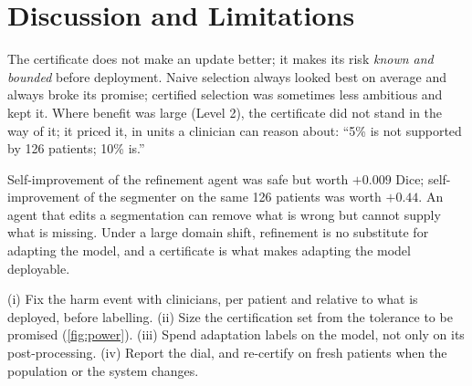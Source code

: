 \section{Discussion and Limitations}
\label{sec:discussion}

The certificate does not make an update better; it makes its risk \emph{known and bounded} before deployment.
Naive selection always looked best on average and always broke its promise; certified selection was sometimes less ambitious and kept it.
Where benefit was large (Level 2), the certificate did not stand in the way of it; it priced it, in units a clinician can reason about: ``5\% is not supported by 126 patients; 10\% is.''

Self-improvement of the refinement agent was safe but worth $+0.009$ Dice; self-improvement of the segmenter on the same 126 patients was worth $+0.44$.
An agent that edits a segmentation can remove what is wrong but cannot supply what is missing.
Under a large domain shift, refinement is no substitute for adapting the model, and a certificate is what makes adapting the model deployable.

(i) Fix the harm event with clinicians, per patient and relative to what is deployed, before labelling.
(ii) Size the certification set from the tolerance to be promised (\cref{fig:power}).
(iii) Spend adaptation labels on the model, not only on its post-processing.
(iv) Report the dial, and re-certify on fresh patients when the population or the system changes.

